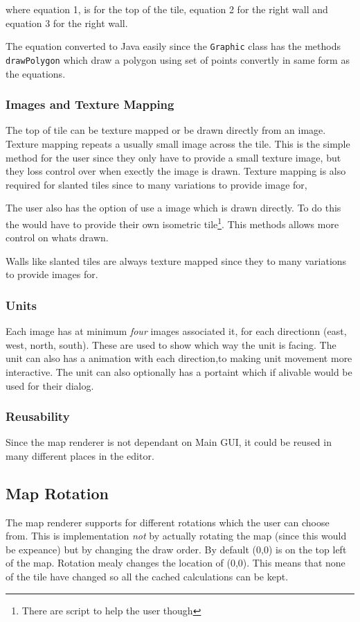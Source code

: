 where equation 1, is for the top of the tile,  equation 2 for the right wall and equation 3 for the right wall. 

The equation converted to Java easily since the \texttt{Graphic} class has the methods  \texttt{drawPolygon} which draw a polygon using set of points convertly in same form as the equations.
\subsubsection{Images and Texture Mapping}
The top of tile can be texture mapped or be drawn directly from an image.  Texture mapping repeats a usually small image across the tile. This is the simple method for the user since they only have to provide a small texture image, but they loss control over when exectly the image is drawn.  Texture mapping is also required for slanted tiles since to many variations to provide image for,

The user also has the option of use a image which is drawn directly. To do this the would have to provide their own isometric tile\footnote{There are script to help the user though}. This methods allows more control on whats drawn.  

Walls like slanted tiles are always texture mapped since they to many variations to provide images for. 

\subsubsection{Units}
Each image has at minimum \emph{four} images associated it, for each directionn (east, west, north, south). These are used to show which way the unit is facing. The unit can also has a animation with each direction,to making unit movement more interactive. The unit can also optionally has a portaint which if alivable would be used for their dialog.

\subsubsection{Reusability}
Since the map renderer is not dependant on Main GUI, it could be reused in many different places in the editor. 

\subsection{Map Rotation}
The map renderer supports for different rotations which the user can choose from. This is implementation \emph{not} by actually rotating the map (since this would be expeance) but by changing the draw order. By default (0,0) is on the top left of the map. Rotation mealy changes the location of (0,0). This means that none of the tile have changed so all the cached calculations can be kept. 

